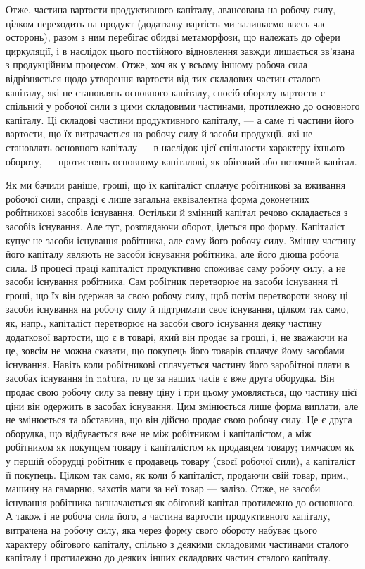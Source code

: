 Отже, частина вартости продуктивного капіталу, авансована на робочу силу, цілком переходить на
продукт (додаткову вартість ми залишаємо ввесь час осторонь), разом з ним перебігає обидві
метаморфози, що належать до сфери циркуляції, і в наслідок цього постійного відновлення завжди
лишається зв’язана з продукційним процесом. Отже, хоч як у всьому іншому робоча сила відрізняється
щодо утворення вартости від тих складових частин сталого капіталу, які не становлять основного
капіталу, спосіб обороту вартости є спільний у робочої сили з цими складовими частинами,
протилежно до основного капіталу. Ці складові частини продуктивного капіталу, — а саме ті частини
його вартости, що їх витрачається на робочу силу й засоби продукції, які не становлять основного
капіталу — в наслідок цієї спільности характеру їхнього обороту, — протистоять основному капіталові,
як обіговий або поточний капітал.

Як ми бачили раніше, гроші, що їх капіталіст сплачує робітникові за вживання робочої сили, справді є
лише загальна еквівалентна форма доконечних робітникові засобів існування. Остільки й змінний
капітал речово складається з засобів існування. Але тут, розглядаючи оборот, ідеться про форму.
Капіталіст купує не засоби існування робітника, але саму його робочу силу. Змінну частину його
капіталу являють не засоби існування робітника, але його діюща робоча сила. В процесі праці
капіталіст продуктивно споживає саму робочу силу, а не засоби існування робітника. Сам робітник
перетворює на засоби існування ті гроші, що їх він одержав за свою робочу силу, щоб потім
перетвороти знову ці засоби існування на робочу силу й підтримати своє існування, цілком так само,
як, напр., капіталіст перетворює на засоби свого існування деяку частину додаткової вартости, що є в
товарі, який він продає за гроші, і, не зважаючи на це, зовсім не можна сказати, що покупець його
товарів сплачує йому засобами існування. Навіть коли робітникові сплачується частину його заробітної
плати в засобах існування in natura, то це за наших часів є вже друга оборудка. Він продає свою
робочу силу за певну ціну і при цьому умовляється, що частину цієї ціни він одержить в засобах
існування. Цим змінюється лише форма виплати, але не змінюється та обставина, що він дійсно продає
свою робочу силу. Це є друга оборудка, що відбувається вже не між робітником і капіталістом, а між
робітником як покупцем товару і капіталістом як продавцем товару; тимчасом як у першій оборудці
робітник є продавець товару (своєї робочої сили), а капіталіст її покупець. Цілком так само, як коли
б капіталіст, продаючи свій товар, прим., машину на гамарню, захотів мати за неї товар — залізо.
Отже, не засоби існування робітника визначаються як обіговий капітал протилежно до основного. А
також і не робоча сила його, а частина вартости продуктивного капіталу, витрачена на робочу силу,
яка через форму свого обороту набуває цього характеру обігового капіталу, спільно з деякими
складовими частинами сталого капіталу і протилежно до деяких інших складових частин сталого
капіталу.

